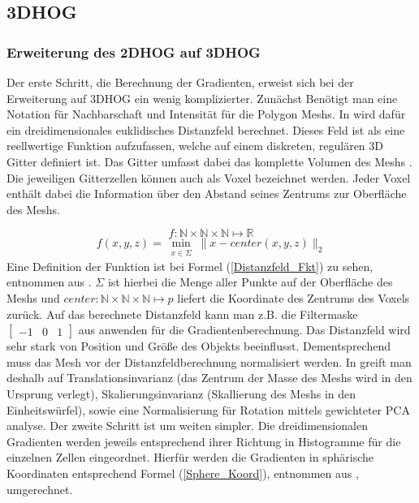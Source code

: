 \subsection{3DHOG}


\subsubsection{Erweiterung des 2DHOG auf 3DHOG}
Der erste Schritt, die Berechnung der Gradienten, erweist sich bei der Erweiterung auf 3DHOG ein wenig komplizierter. Zunächst Benötigt man eine Notation für Nachbarschaft und Intensität für die Polygon Meshs. In \cite{scherer2010histograms} wird dafür ein dreidimensionales euklidisches 
Distanzfeld berechnet. Dieses Feld ist als eine reellwertige Funktion aufzufassen, welche auf einem diskreten, regulären 3D Gitter definiert ist. Das Gitter umfasst dabei das komplette Volumen des Meshs \cite{scherer2010histograms}. Die jeweiligen Gitterzellen können auch als Voxel bezeichnet werden. Jeder Voxel enthält dabei die Information über den Abstand seines Zentrums zur Oberfläche des Meshs. 

\begin{equation*}
f: \mathbb{N} \times \mathbb{N} \times \mathbb{N} \mapsto \mathbb{R} 
\end{equation*}
\begin{equation}
\label{Distanzfeld_Fkt}
f(x,y,z) = \min_{\substack{x \in \Sigma}} \| x-center(x,y,z) \|_2
\end{equation}
Eine Definition der Funktion ist bei Formel (\ref{Distanzfeld_Fkt}) zu sehen, entnommen aus \cite{scherer2010histograms}. $\Sigma$ ist hierbei die Menge aller Punkte auf der Oberfläche des Meshs und $center: \mathbb{N} \times \mathbb{N} \times \mathbb{N} \mapsto p $ liefert die Koordinate des Zentrums des Voxels zurück.
\newline
Auf das berechnete Distanzfeld kann man z.B. die Filtermaske $\begin{bmatrix} -1 & 0 & 1\end{bmatrix}$ aus \cite{dalal2005histograms} anwenden für die Gradientenberechnung.
\newline
Das Distanzfeld wird sehr stark von Position und Größe des Objekts beeinflusst. Dementsprechend muss das Mesh vor der Distanzfeldberechnung normalisiert werden. In \cite{scherer2010histograms} greift man deshalb auf Translationsinvarianz  (das Zentrum der Masse des Meshs wird in den Ursprung verlegt), Skalierungsinvarianz (Skallierung des Meshs in den Einheitswürfel), sowie eine Normalisierung für Rotation mittels gewichteter PCA analyse.
\newline
Der zweite Schritt ist um weiten simpler. Die dreidimensionalen Gradienten werden jeweils entsprechend ihrer Richtung in Histogramme für die einzelnen Zellen eingeordnet. Hierfür werden die Gradienten in sphärische Koordinaten entsprechend Formel (\ref{Sphere_Koord}), entnommen aus \cite{scherer2010histograms}, umgerechnet.

